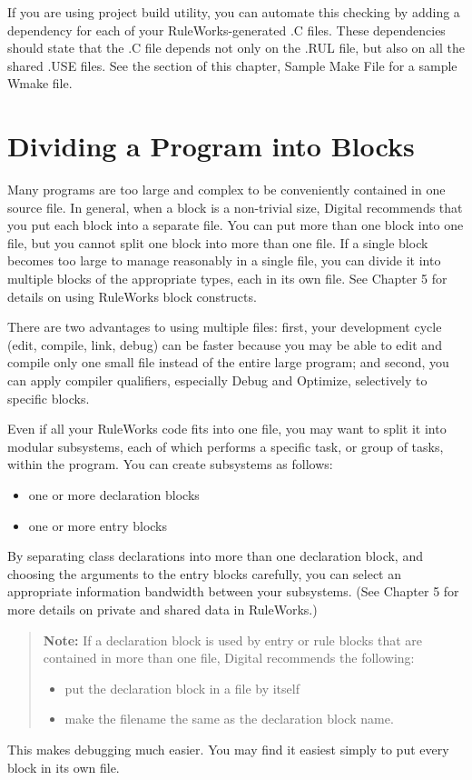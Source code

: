If you are using project build utility, you can automate
this checking by adding a dependency for each of your
RuleWorks-generated .C files. These dependencies should
state that the .C file depends not only on the .RUL file,
but also on all the shared .USE files. See the section of
this chapter, Sample Make File for a sample Wmake file.

\section{Dividing a Program into Blocks}

Many programs are too large and complex to be
conveniently contained in one source file. In general,
when a block is a non-trivial size, Digital recommends
that you put each block into a separate file. You can put
more than one block into one file, but you cannot split
one block into more than one file. If a single block
becomes too large to manage reasonably in a single file,
you can divide it into multiple blocks of the appropriate
types, each in its own file. See Chapter 5 for details on
using RuleWorks block constructs.

There are two advantages to using multiple files: first,
your development cycle (edit, compile, link, debug) can
be faster because you may be able to edit and compile
only one small file instead of the entire large program;
and second, you can apply compiler qualifiers, especially
Debug and Optimize, selectively to specific blocks.

Even if all your RuleWorks code fits into one file, you
may want to split it into modular subsystems, each of
which performs a specific task, or group of tasks, within
the program. You can create subsystems as follows:
\begin{itemize}
\item one or more declaration blocks
\item one or more entry blocks
\end{itemize}
By separating class declarations into more than one
declaration block, and choosing the arguments to the
entry blocks carefully, you can select an appropriate
information bandwidth between your subsystems. (See
Chapter 5 for more details on private and shared data in
RuleWorks.)
\begin{quote}
  \textbf{Note:} If a declaration block is used by entry or rule
  blocks that are contained in more than one file,
  Digital recommends the following:
\begin{itemize}
\item put the declaration block in a file by itself
\item make the filename the same as the declaration block
    name.
\end{itemize}
\end{quote}
This makes debugging much easier. You may find it easiest
simply to put every block in its own file.

